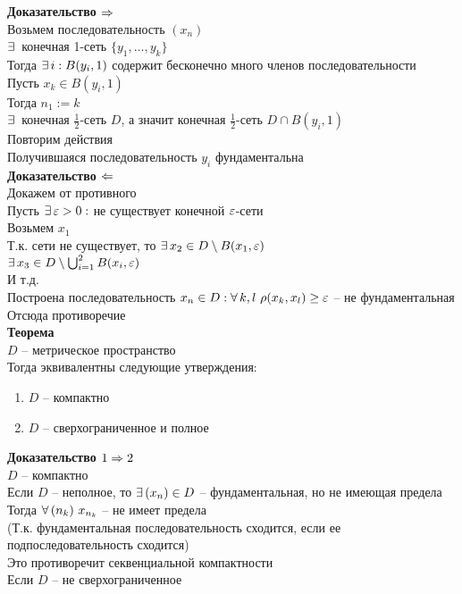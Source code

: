 \documentclass[12pt]{article}
\begin{document}
\textbf{Доказательство $\Rightarrow$}\\
Возьмем последовательность $(x_n)$\\
$\exists\,$ конечная 1-сеть $\{y_1, \ldots, y_k\}$\\
Тогда $\exists\, i: B(y_i, 1)$ содержит бесконечно много членов последовательности\\
Пусть $x_k \in B(y_i, 1)$\\
Тогда $n_1 := k$\\
$\exists\,$ конечная $\frac12$-сеть $D$, а значит конечная $\frac12$-сеть $D \cap B(y_i, 1)$\\
Повторим действия\\
Получившаяся последовательность $y_i$ фундаментальна\\
\textbf{Доказательство $\Leftarrow$}\\
Докажем от противного\\
Пусть $\exists\, \varepsilon > 0:$ не существует конечной $\varepsilon$-сети\\
Возьмем $x_1$\\
Т.к. сети не существует, то $\exists\, x_2 \in D \setminus B(x_1, \varepsilon)$\\
$\exists\, x_3 \in D \setminus \bigcup_{i=1}^2 B(x_i, \varepsilon)$\\
И т.д.\\
Построена последовательность $x_n \in D: \forall\, k, l\ \rho(x_k, x_l) \geq \varepsilon$ -- не фундаментальная\\
Отсюда противоречие\\
\textbf{Теорема}\\
$D$ -- метрическое пространство\\
Тогда эквивалентны следующие утверждения:
\begin{enumerate}
    \item $D$ -- компактно
    \item $D$ -- сверхограниченное и полное
\end{enumerate}
\textbf{Доказательство $1 \Rightarrow 2$}\\
$D$ -- компактно\\
Если $D$ -- неполное, то $\exists\, (x_n) \in D$ -- фундаментальная, но не имеющая предела\\
Тогда $\forall\, (n_k)\ x_{n_k}$ -- не имеет предела\\
(Т.к. фундаментальная последовательность сходится, если ее подпоследовательность сходится)\\
Это противоречит секвенциальной компактности\\
Если $D$ -- не сверхограниченное\\
\end{document}
